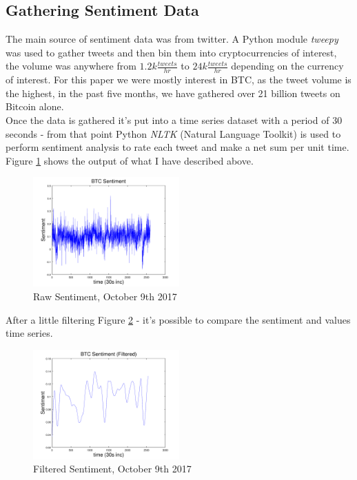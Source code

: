 \documentclass[12pt,journal,compsoc]{IEEEtran}
\begin{document}
\subsection{Gathering Sentiment Data}
The main source of sentiment data was from twitter. A Python module \textit{tweepy} \cite{Tweepy} was used to gather
tweets and then bin them into cryptocurrencies of interest, the volume was anywhere from $1.2k \frac{tweets}{hr}$
to $24k \frac{tweets}{hr}$ depending on the currency of interest. For this paper we were mostly interest in BTC, as the
tweet volume is the highest, in the past five months, we have gathered over 21 billion tweets on Bitcoin alone.\\

Once the data is gathered it's put into a time series dataset with a period of 30 seconds - from that point Python \textit{NLTK} 
(Natural Language Toolkit) \cite{NLTK} is used to perform sentiment analysis to rate each tweet and make a net sum per unit time. 
Figure \ref{fig:RawSent} shows the output of what I have described above.

\begin{figure}[hp]
	\centering
	\includegraphics[width=0.5\textwidth]{../Datasets/Plots/Oct9_Sen}
	\caption{Raw Sentiment, October 9th 2017}
	\label{fig:RawSent}
\end{figure}

After a little filtering Figure \ref{fig:FilteredSent} - it's possible to compare the sentiment and values time series.

\begin{figure}[h]
	\centering
	\includegraphics[width=0.5\textwidth]{../Datasets/Plots/Oct9_Sen_Fil}
	\caption{Filtered Sentiment, October 9th 2017}
	\label{fig:FilteredSent}
\end{figure}
\end{document}
